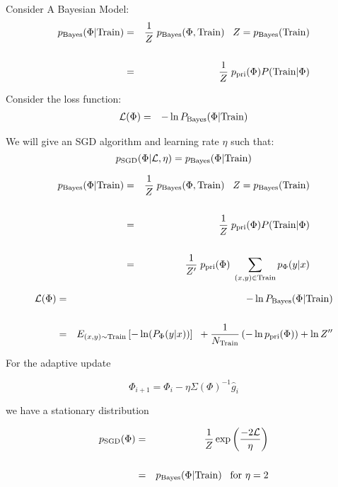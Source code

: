 {

Consider A Bayesian Model:
{\huge
\begin{eqnarray*}
p_{\mathrm{Bayes}}(\Phi|\mathrm{Train}) & = & \frac{1}{Z}\;p_{\mathrm{Bayes}}(\Phi,\mathrm{Train})\;\;\;Z = p_\mathrm{Bayes}(\mathrm{Train}) \\
\\
 & = & \frac{1}{Z}\; p_{\mathrm{pri}}(\Phi)P(\mathrm{Train}|\Phi)
 \end{eqnarray*}
}

Consider the loss function:
{\huge
\begin{eqnarray*}
{\cal L}(\Phi) & = & -\ln P_\mathrm{Bayes}(\Phi|\mathrm{Train})
\end{eqnarray*}
}

We will give an SGD algorithm and learning rate $\eta$ such that:
{\huge
$$p_\mathrm{SGD}(\Phi|{\cal L},\eta) = p_\mathrm{Bayes}(\Phi|\mathrm{Train})$$
}


{\huge
\begin{eqnarray*}
p_{\mathrm{Bayes}}(\Phi|\mathrm{Train}) & = & \frac{1}{Z}\;p_{\mathrm{Bayes}}(\Phi,\mathrm{Train})\;\;\;Z = p_\mathrm{Bayes}(\mathrm{Train}) \\
\\
 & = & \frac{1}{Z}\; p_{\mathrm{pri}}(\Phi)P(\mathrm{Train}|\Phi) \\
 \\
 & = & \frac{1}{Z'}\; p_{\mathrm{pri}}(\Phi)\;\sum_{(x,y) \in \mathrm{Train}} p_\Phi(y|x)
 \end{eqnarray*}
}

\vfill

{\huge
\begin{eqnarray*}
{\cal L}(\Phi) & = & -\ln P_\mathrm{Bayes}(\Phi|\mathrm{Train}) \\
\\
& = & E_{(x,y) \sim \mathrm{Train}}\left[-\ln(P_\Phi(y|x))\right] \;\;+ \frac{1}{N_{\mathrm{Train}}}\left(-\ln p_{\mathrm{pri}}(\Phi)\right) + \ln Z''
\end{eqnarray*}
}


For the adaptive update

\vfill
$$\Phi_{i+1} = \Phi_{i} - \eta \Sigma(\Phi)^{-1} \hat{g}_i$$

\vfill
we have a stationary distribution

\vfill
\begin{eqnarray*}
p_\mathrm{SGD}(\Phi) & = & \frac{1}{Z} \exp\left(\frac{-2{\cal L}}{\eta}\right) \\
\\
& = & p_\mathrm{Bayes}(\Phi|\mathrm{Train})\;\;\;\mbox{for $\eta = 2$}
\end{eqnarray*}

}
